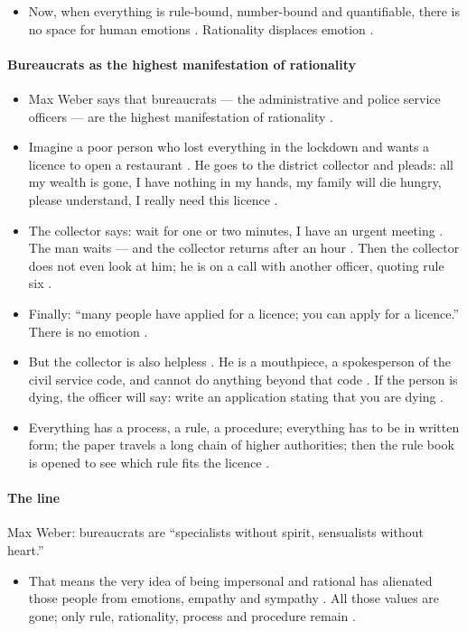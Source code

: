 \begin{itemize}
    \item Now, when everything is rule-bound, number-bound and quantifiable, there is no space for human emotions . Rationality displaces emotion .
\end{itemize}

\paragraph{Bureaucrats as the highest manifestation of rationality}
\begin{itemize}
    \item Max Weber says that bureaucrats --- the administrative and police service officers --- are the highest manifestation of rationality .
\end{itemize}

\begin{ExampleBox}
\begin{itemize}
    \item Imagine a poor person who lost everything in the lockdown and wants a licence to open a restaurant . He goes to the district collector and pleads: all my wealth is gone, I have nothing in my hands, my family will die hungry, please understand, I really need this licence .
    \item The collector says: wait for one or two minutes, I have an urgent meeting . The man waits --- and the collector returns after an hour . Then the collector does not even look at him; he is on a call with another officer, quoting rule six .
    \item Finally: ``many people have applied for a licence; you can apply for a licence.''  There is no emotion .
    \item But the collector is also helpless . He is a mouthpiece, a spokesperson of the civil service code, and cannot do anything beyond that code . If the person is dying, the officer will say: write an application stating that you are dying .
    \item Everything has a process, a rule, a procedure; everything has to be in written form; the paper travels a long chain of higher authorities; then the rule book is opened to see which rule fits the licence .
\end{itemize}
\end{ExampleBox}

\paragraph{The line}
\begin{KeyConcept}
Max Weber: bureaucrats are ``specialists without spirit, sensualists without heart.'' 
\begin{itemize}
    \item That means the very idea of being impersonal and rational has alienated those people from emotions, empathy and sympathy . All those values are gone; only rule, rationality, process and procedure remain .
\end{itemize}
\end{KeyConcept}

